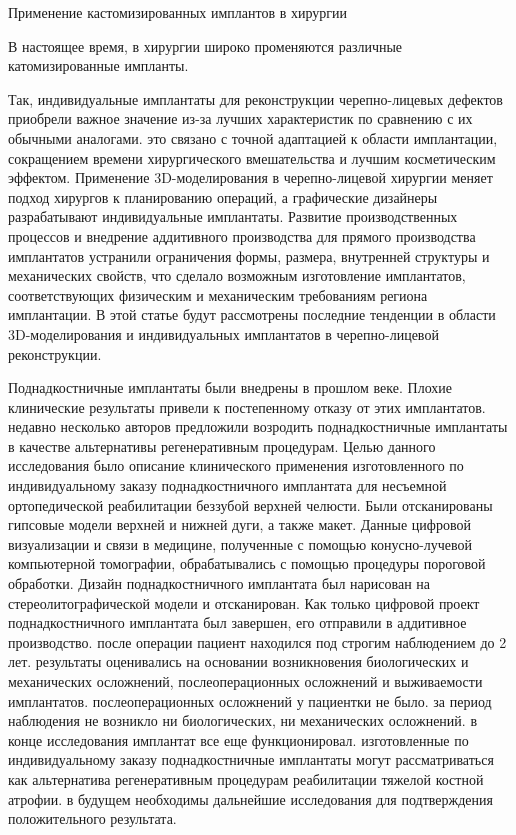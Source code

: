 
Применение кастомизированных имплантов в хирургии 

В настоящее время, в хирургии широко променяются различные катомизированные
импланты. 

Так, индивидуальные имплантаты для реконструкции черепно-лицевых дефектов приобрели
важное значение из-за лучших характеристик по сравнению с их обычными аналогами.
это связано с точной адаптацией к области имплантации, сокращением времени
хирургического вмешательства и лучшим косметическим эффектом. Применение
3D-моделирования в черепно-лицевой хирургии меняет подход хирургов к
планированию операций, а графические дизайнеры разрабатывают индивидуальные
имплантаты. Развитие производственных процессов и внедрение аддитивного
производства для прямого производства имплантатов устранили ограничения формы,
размера, внутренней структуры и механических свойств, что сделало возможным
изготовление имплантатов, соответствующих физическим и механическим требованиям
региона имплантации. В этой статье будут рассмотрены последние тенденции в
области 3D-моделирования и индивидуальных имплантатов в черепно-лицевой
реконструкции.\cite{pmid24987592}

Поднадкостничные имплантаты были внедрены в прошлом веке. Плохие клинические
результаты привели к постепенному отказу от этих имплантатов. недавно несколько
авторов предложили возродить поднадкостничные имплантаты в качестве альтернативы
регенеративным процедурам. Целью данного исследования было описание клинического
применения изготовленного по индивидуальному заказу поднадкостничного имплантата
для несъемной ортопедической реабилитации беззубой верхней челюсти. Были
отсканированы гипсовые модели верхней и нижней дуги, а также макет. Данные
цифровой визуализации и связи в медицине, полученные с помощью конусно-лучевой
компьютерной томографии, обрабатывались с помощью процедуры пороговой обработки.
Дизайн поднадкостничного имплантата был нарисован на стереолитографической
модели и отсканирован. Как только цифровой проект поднадкостничного имплантата
был завершен, его отправили в аддитивное производство. после операции пациент
находился под строгим наблюдением до 2 лет. результаты оценивались на основании
возникновения биологических и механических осложнений, послеоперационных
осложнений и выживаемости имплантатов. послеоперационных осложнений у пациентки
не было. за период наблюдения не возникло ни биологических, ни механических
осложнений. в конце исследования имплантат все еще функционировал. изготовленные
по индивидуальному заказу поднадкостничные имплантаты могут рассматриваться как
альтернатива регенеративным процедурам реабилитации тяжелой костной атрофии. в
будущем необходимы дальнейшие исследования для подтверждения положительного
результата.\cite{36345834}

